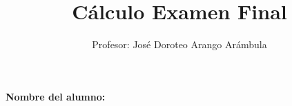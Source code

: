 \documentclass[10pt,oneside]{article}
\author{Profesor: José Doroteo Arango Arámbula} %
\title{Cálculo Examen Final}
\begin{document}
\maketitle
\textbf{Nombre del alumno:}\hrulefill

\end{document}
